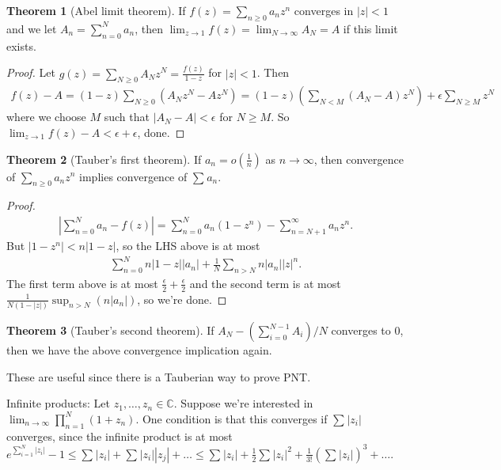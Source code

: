 \documentclass{article}
\theoremstyle{definition}
\newtheorem{theorem}{Theorem}[section]
\theoremstyle{remark}
\begin{document}
\begin{theorem}[Abel limit theorem]
    If $f(z) = \sum_{n\ge 0}^{} a_n z^n$ converges in $|z|<1$ and we let $A_n = \sum_{n=0}^{N} a_n$, then $\lim_{z \to 1} f(z) = \lim_{N \to \infty} A_N = A$ if this limit exists.
\end{theorem}
\begin{proof}
    Let $g(z) = \sum_{N\ge 0}^{} A_N z^N = \frac{f(z)}{1-z}$ for $|z|<1$. Then 
    \begin{align*}
        f(z) - A = (1-z)\sum_{N\ge 0}^{} (A_Nz^N - Az^N) = (1-z)\left(\sum_{N<M}^{} (A_N-A)z^N\right) + \epsilon\sum_{N\ge M}^{} z^N
    \end{align*}
    where we choose $M$ such that $|A_N - A| < \epsilon$ for $N\ge M$.
    So $\lim_{z \to 1}f(z)-A < \epsilon + \epsilon$, done.
\end{proof}
\begin{theorem}[Tauber's first theorem]
    If $a_n = o(\frac{1}{n})$ as $n \to \infty$, then convergence of  $\sum_{n \ge 0}^{} a_n z^n$ implies convergence of $\sum_{}^{} a_n$.
\end{theorem}
\begin{proof}
    \begin{align*}
        \left |\sum_{n=0}^{N} a_n-f(z)\right | = \sum_{n=0}^{N} a_n(1-z^n) - \sum_{n=N+1}^{\infty} a_nz^n.
    \end{align*}
    But $|1-z^n| < n|1-z|$, so the LHS above is at most 
    \begin{align*}
        \sum_{n=0}^{N} n|1-z||a_n| + \frac{1}{N}\sum_{n>N}^{} n |a_n||z|^n.
    \end{align*}
    The first term above is at most $\frac{\epsilon}{2}+\frac{\epsilon}{2}$ and the second term is at most $\frac{1}{N(1-|z|)} \sup_{n>N} (n|a_n|)$, so we're done.
\end{proof}
\begin{theorem}[Tauber's second theorem]
    If $A_N - (\sum_{i=0}^{N-1} A_i)/N$ converges to 0, then we have the above convergence implication again.
\end{theorem}
These are useful since there is a Tauberian way to prove PNT.
\vspace{1mm}

Infinite products: Let $z_1,\ldots, z_n \in \mathbb{C}$. Suppose we're interested in $\lim_{n \to \infty} \prod_{n=1}^{N} (1+z_n)$. One condition is that this converges if $\sum_{}^{} |z_i|$ converges, since the infinite product is at most $e^{\sum_{i=1}^{N} |z_i|} -1 \le \sum_{}^{} |z_i| + \sum_{}^{} |z_i||z_j| + \ldots \le \sum_{}^{} |z_i| + \frac{1}{2}\sum_{}^{} |z_i|^2 + \frac{1}{3!}(\sum_{}^{} |z_i|)^3 + \ldots$.
\end{document}

